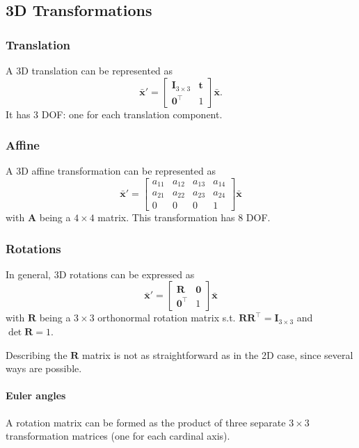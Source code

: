 \subsection{3D Transformations}

\subsubsection{Translation}
A 3D translation can be represented as
$$\bar{\mathbf{x}}'=\begin{bmatrix}
\mathbf{I}_{3 \times 3} & \mathbf{t} \\
\mathbf{0}^{\top} & 1
\end{bmatrix} \bar{\mathbf{x}}.$$
It has 3 DOF: one for each translation component.

\subsubsection{Affine}
A 3D affine transformation can be represented as
$$\bar{\mathbf{x}}'=\begin{bmatrix}
a_{11} & a_{12} & a_{13} & a_{14} \\
a_{21} & a_{22} & a_{23} & a_{24} \\
0 & 0 & 0 & 1
\end{bmatrix}\bar{\mathbf{x}}$$
with $\mathbf{A}$ being a $4\times4$ matrix. This transformation has $8$ DOF.

\subsubsection{Rotations}
In general, 3D rotations can be expressed as
$$\bar{\mathbf{x}}'=\begin{bmatrix}
\mathbf{R} & \mathbf{0} \\
\mathbf{0}^{\top} & 1
\end{bmatrix}\bar{\mathbf{x}}$$
with $\mathbf{R}$ being a $3\times 3$ orthonormal rotation matrix s.t. $\mathbf{R}\mathbf{R}^{\top}=\mathbf{I}_{3 \times 3}$ and $\det\mathbf{R}=1$.

Describing the $\mathbf{R}$ matrix is not as straightforward as in the 2D case, since several ways are possible.

\paragraph{Euler angles}
A rotation matrix can be formed as the product of three separate $3 \times 3$ transformation matrices (one for each cardinal axis).

